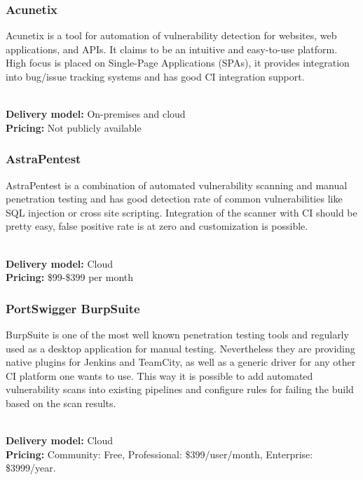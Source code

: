 \documentclass[conference]{IEEEtran}
\begin{document}
\noindent

\subsubsection{Acunetix \cite{dast2}}

Acunetix is a tool for automation of vulnerability detection for websites, web applications, and APIs. It claims to be an intuitive and easy-to-use platform. High focus is placed on Single-Page Applications (SPAs), it provides integration into bug/issue tracking systems and has good CI integration support.

\noindent\\
\textbf{Delivery model:} On-premises and cloud
\noindent\\
\textbf{Pricing:} Not publicly available
\\

\noindent
\subsubsection{AstraPentest \cite{dast3}}

AstraPentest is a combination of automated vulnerability scanning and manual penetration testing and has good detection rate of common vulnerabilities like SQL injection or cross site scripting. Integration of the scanner with CI should be pretty easy, false positive rate is at zero and customization is possible.

\noindent\\
\textbf{Delivery model:} Cloud
\noindent\\
\textbf{Pricing:} \$99-\$399 per month
\\

\noindent
\subsubsection{PortSwigger BurpSuite \cite{dast4}}

BurpSuite is one of the most well known penetration testing tools and regularly used as a desktop application for manual testing. Nevertheless they are providing native plugins for Jenkins and TeamCity, as well as a generic driver for any other CI platform one wants to use. This way it is possible to add automated vulnerability scans into existing pipelines and configure rules for failing the build based on the scan results.

\noindent\\
\textbf{Delivery model:} Cloud
\noindent\\
\textbf{Pricing:} Community: Free, Professional: \$399/user/month, Enterprise: \$3999/year. 
\\
\end{document}
